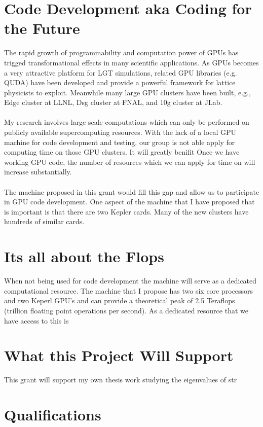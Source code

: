 \documentclass[11pt]{article}
\begin{document}
  \section*{Code Development aka Coding for the Future} %
 The rapid growth of programmability and computation power of GPUs has trigged transformational effects in many scientific applications. As GPUs becomes 
 a very attractive platform for LGT simulations, related GPU libraries (e.g. QUDA) have been developed and  
 provide a powerful framework for lattice physicists to exploit. Meanwhile many large GPU clusters have been built, e.g., Edge cluster at LLNL,
 Dsg cluster at FNAL, and 10g cluster at JLab.\\\\
 My research involves large scale computations which can only be performed on publicly available supercomputing resources. With the lack of a local GPU machine for code development and testing, our group is not able apply for computing time on those GPU clusters. It will greatly benifit 
  Once we have working GPU code, the number of resources which we can apply for time on will increase substantially.\\\\

 The machine proposed in this grant would fill this gap and allow us to participate in GPU code development.  One aspect of the machine that I have proposed that is important is that there are two Kepler cards.  Many of the new clusters have hundreds of similar cards.  
  
  \section*{Its all about the Flops} %
  When not being used for code development the machine will serve as a dedicated computational resource.  
  The machine that I propose has two six core processors and two Keperl GPU's and can provide a theoretical peak of 2.5 Teraflops (trillion floating point operations per second).  
  As a dedicated resource that we have access to this is

  \section*{What this Project Will Support} %
  This grant will support my own thesis work studying the eigenvalues of str

  \section*{Qualifications} %
\end{document}
